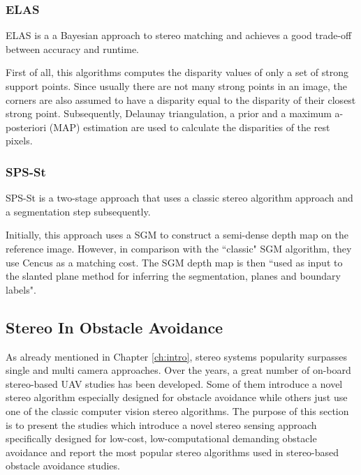 \subsubsection{ELAS}

\ac{ELAS} \cite{Geiger2011} is a a Bayesian approach to stereo matching and achieves a good trade-off between accuracy and runtime. 

First of all, this algorithms computes the disparity values of only a set of strong support points. Since usually there are not many strong points in an image, the corners are also assumed to have a disparity equal to the disparity of their closest strong point. Subsequently, Delaunay triangulation, a prior and a maximum a-posteriori (MAP) estimation are used to calculate the disparities of the rest pixels.

\subsubsection{SPS-St}

\ac{SPS-St} \cite{Yamaguchi2014} is a two-stage approach that uses a classic stereo algorithm approach and a segmentation step subsequently. 

Initially, this approach uses a \ac{SGM} to construct a semi-dense depth map on the reference image. However, in comparison with the ``classic" \ac{SGM} algorithm, they use Cencus as a matching cost. The \ac{SGM} depth map is then ``used as input to the slanted plane method for inferring the segmentation, planes and boundary labels".



\subsection{Stereo In Obstacle Avoidance}
\label{ch:literature:state_of_the_art_stereo}


As already mentioned in Chapter \ref{ch:intro}, stereo systems popularity surpasses single and multi camera approaches. Over the years, a great number of on-board stereo-based UAV studies has been developed. Some of them introduce a novel stereo algorithm especially designed for obstacle avoidance while others just use one of the classic computer vision stereo algorithms. The purpose of this section is to present the studies which introduce a novel stereo sensing approach specifically designed for low-cost, low-computational demanding obstacle avoidance and report the most popular stereo algorithms used in stereo-based obstacle avoidance studies. 

